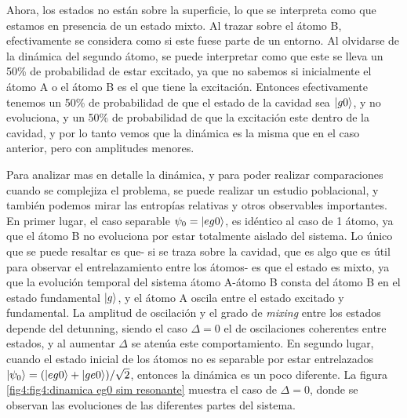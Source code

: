 Ahora, los estados no están sobre la superficie, lo que se interpreta como que estamos en presencia de un estado mixto. Al trazar sobre el átomo B, efectivamente se considera como si este fuese parte de un entorno. Al olvidarse de la dinámica del segundo átomo, se puede interpretar como que este se lleva un 50\% de probabilidad de estar excitado, ya que no sabemos si inicialmente el átomo A o el átomo B es el que tiene la excitación. Entonces efectivamente tenemos un 50\% de probabilidad de que el estado de la cavidad sea $\ket{g0}$, y no evoluciona, y un 50\% de probabilidad de que la excitación este dentro de la cavidad, y por lo tanto vemos que la dinámica es la misma que en el caso anterior, pero con amplitudes menores.

Para analizar mas en detalle la dinámica, y para poder realizar comparaciones cuando se complejiza el problema, se puede realizar un estudio poblacional, y también podemos mirar las entropías relativas y otros observables importantes.
En primer lugar, el caso separable $\psi_0=\ket{eg0}$, es idéntico al caso de 1 átomo, ya que el átomo B no evoluciona por estar totalmente aislado del sistema. Lo único que se puede resaltar es que- si se traza sobre la cavidad, que es algo que es útil para observar el entrelazamiento entre los átomos-  es que el estado es mixto, ya que la evolución temporal del sistema átomo A-átomo B consta del átomo B en el estado fundamental $\ket{g}$, y el átomo A oscila entre el estado excitado y fundamental. La amplitud de oscilación y el grado de \textit{mixing} entre los estados depende del detunning, siendo el caso $\Delta=0$ el de oscilaciones coherentes entre estados, y al aumentar $\Delta$ se atenúa este comportamiento.
En segundo lugar, cuando el estado inicial de los átomos no es separable por estar entrelazados $\ket{\psi_0}=(\ket{eg0} + \ket{ge0})/\sqrt{2}$, entonces la dinámica es un poco diferente. La figura \ref{fig4:fig4:dinamica eg0 sim resonante} muestra el caso de $\Delta=0$, donde se observan las evoluciones de las diferentes partes del sistema.

